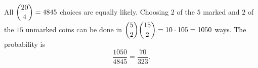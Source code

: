 All \(\dbinom{20}{4}=4845\) choices are equally likely. Choosing \(2\) of the \(5\) marked and \(2\) of the \(15\) unmarked coins can be done in \(\dbinom52\dbinom{15}{2}=10\cdot 105=1050\) ways. The probability is
\[
\dfrac{1050}{4845}=\boxed{\dfrac{70}{323}}.
\]
